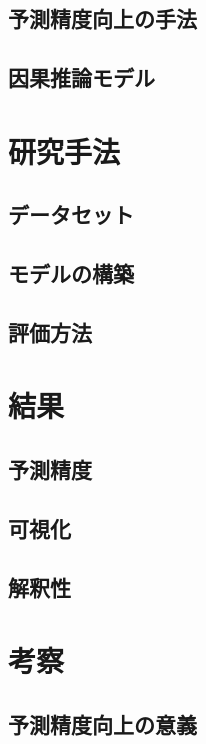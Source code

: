 \documentclass[12pt,a4paper,oneside]{jsbook}
\theoremstyle{plain}
\begin{document}
\section{予測精度向上の手法}
\section{因果推論モデル}

\chapter{研究手法}
\section{データセット}
\section{モデルの構築}
\section{評価方法}

\chapter{結果}
\section{予測精度}
\section{可視化}
\section{解釈性}

\chapter{考察}
\section{予測精度向上の意義}
\end{document}
